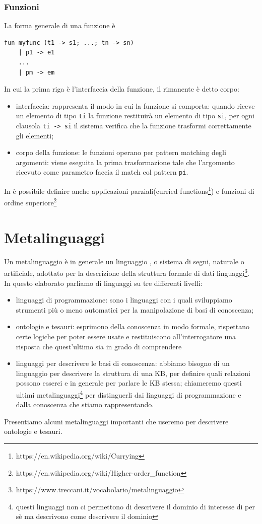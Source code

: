 \subsubsection{Funzioni}
La forma generale di una funzione è
\begin{verbatim}
fun myfunc (t1 -> s1; ...; tn -> sn)
	| p1 -> e1
	...
	| pm -> em
\end{verbatim}
In cui la prima riga è l'interfaccia della funzione, il rimanente è detto corpo:
\begin{itemize}
	\item interfaccia: rappresenta il modo in cui la funzione si comporta: quando riceve un elemento di tipo \verb|ti| la funzione restituirà un elemento di tipo \verb|si|, per ogni clausola \verb|ti -> si| il sistema verifica che la funzione trasformi correttamente gli elementi;
	\item corpo della funzione: le funzioni operano per pattern matching degli argomenti: viene eseguita la prima trasformazione tale che l'argomento ricevuto come parametro faccia il match col pattern \verb|pi|. 
\end{itemize}
In \cduce è possibile definire anche applicazioni parziali(curried functions\footnote{https://en.wikipedia.org/wiki/Currying}) e funzioni di ordine superiore\footnote{https://en.wikipedia.org/wiki/Higher-order\_function}
\section{Metalinguaggi}
Un metalinguaggio è in generale un linguaggio , o sistema di segni, naturale o artificiale, adottato per la descrizione della struttura formale di dati linguaggi\footnote{https://www.treccani.it/vocabolario/metalinguaggio}. In questo elaborato parliamo di linguaggi su tre differenti livelli:
\begin{itemize}
	\item linguaggi di programmazione: sono i linguaggi con i quali sviluppiamo strumenti più o meno automatici per la manipolazione di basi di conoscenza;
	\item ontologie e tesauri: esprimono della conoscenza in modo formale, rispettano certe logiche per poter essere usate e restituiscono all'interrogatore una risposta che quest'ultimo sia in grado di comprendere
	\item linguaggi per descrivere le basi di conoscenza: abbiamo bisogno di un linguaggio per descrivere la struttura di una KB, per definire quali relazioni possono esserci e in generale per parlare le KB stessa; chiameremo questi ultimi metalinguaggi\footnote{questi linguaggi non ci permettono di descrivere il dominio di interesse di per sè ma descrivono come descrivere il dominio} per distinguerli dai linguaggi di programmazione e dalla conoscenza che stiamo rappresentando.
\end{itemize}
Presentiamo alcuni metalinguaggi importanti che useremo per descrivere ontologie e tesauri.
